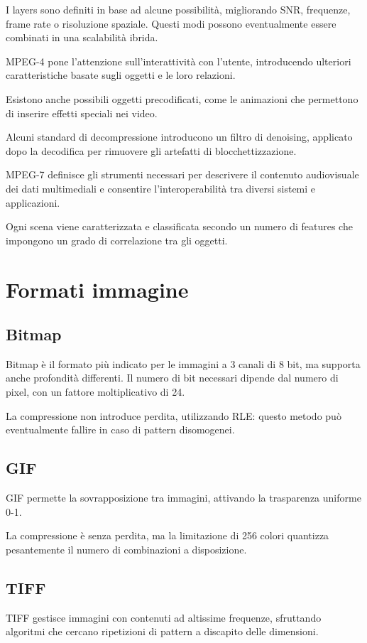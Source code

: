 I layers sono definiti in base ad alcune possibilità, migliorando SNR, frequenze, frame rate o risoluzione spaziale. Questi modi possono eventualmente essere combinati in una scalabilità ibrida. 

MPEG-4 pone l'attenzione sull'interattività con l'utente, introducendo ulteriori caratteristiche basate sugli oggetti e le loro relazioni.

Esistono anche possibili oggetti precodificati, come le animazioni che permettono di inserire effetti speciali nei video.

Alcuni standard di decompressione introducono un filtro di denoising, applicato dopo la decodifica per rimuovere gli artefatti di blocchettizzazione. 

MPEG-7 definisce gli strumenti necessari per descrivere il contenuto audiovisuale dei dati multimediali e consentire l'interoperabilità tra diversi sistemi e applicazioni.

Ogni scena viene caratterizzata e classificata secondo un numero di features che impongono un grado di correlazione tra gli oggetti.


\section{Formati immagine}

\subsection{Bitmap}
Bitmap è il formato più indicato per le immagini a 3 canali di 8 bit, ma supporta anche profondità differenti. Il numero di bit necessari dipende dal numero di pixel, con un fattore moltiplicativo di 24.

La compressione non introduce perdita, utilizzando RLE: questo metodo può eventualmente fallire in caso di pattern disomogenei. 

\subsection{GIF}
GIF permette la sovrapposizione tra immagini, attivando la trasparenza uniforme 0-1.

La compressione è senza perdita, ma la limitazione di 256 colori quantizza pesantemente il numero di combinazioni a disposizione.

\subsection{TIFF}
TIFF gestisce immagini con contenuti ad altissime frequenze, sfruttando algoritmi che cercano ripetizioni di pattern a discapito delle dimensioni.

